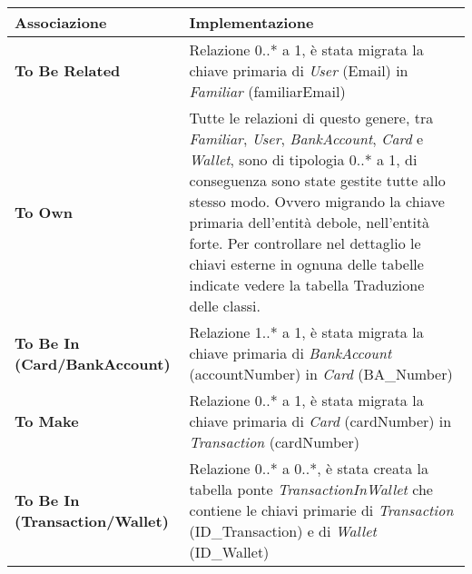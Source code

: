 \begin{longtable}{m{6.7cm}|m{7cm}}

    \rowcolor{black!10}
    \textbf{Associazione} & \textbf{Implementazione} \\ \hline
    \endhead

    \textbf{To Be Related} &
    Relazione 0..* a 1, è stata migrata la chiave primaria di \textit{User} (Email) in \textit{Familiar} (familiarEmail) \\ \hline

    \textbf{To Own} &
    Tutte le relazioni di questo genere, tra \textit{Familiar}, \textit{User}, \textit{BankAccount}, \textit{Card} e \textit{Wallet}, sono di tipologia 0..* a 1,
    di conseguenza sono state gestite tutte allo stesso modo. Ovvero migrando la chiave primaria dell'entità debole, nell'entità forte.
    Per controllare nel dettaglio le chiavi esterne in ognuna delle tabelle indicate vedere la tabella Traduzione delle classi. \\ \hline

    \textbf{To Be In (Card/BankAccount)} &
    Relazione 1..* a 1, è stata migrata la chiave primaria di \textit{BankAccount} (accountNumber) in \textit{Card} (BA\_Number) \\ \hline

    \textbf{To Make} &
    Relazione 0..* a 1, è stata migrata la chiave primaria di \textit{Card} (cardNumber) in \textit{Transaction} (cardNumber) \\ \hline

    \textbf{To Be In (Transaction/Wallet)} &
    Relazione 0..* a 0..*, è stata creata la tabella ponte \textit{TransactionInWallet} che contiene le chiavi primarie di \textit{Transaction} (ID\_Transaction) e di \textit{Wallet} (ID\_Wallet) \\ \hline

\end{longtable}